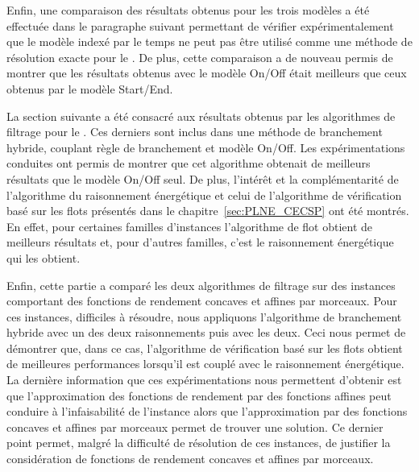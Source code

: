 Enfin, une comparaison des résultats obtenus pour les trois modèles
a été effectuée dans le paragraphe suivant permettant de vérifier
expérimentalement que
le modèle indexé par le temps ne peut pas être utilisé comme une méthode
de résolution exacte pour le \CECSP. De plus, cette comparaison a
de nouveau permis de montrer que les résultats obtenus avec le modèle
On/Off était meilleurs que ceux obtenus par le modèle Start/End. 

La section suivante a été consacré aux résultats obtenus par les
algorithmes de filtrage pour le \CECSP. Ces derniers sont inclus dans
une méthode de branchement hybride, couplant règle de branchement et
modèle On/Off. Les expérimentations conduites ont permis de montrer
que cet algorithme obtenait de meilleurs résultats que le modèle
On/Off seul. De plus, l'intérêt et la complémentarité de l'algorithme
du raisonnement énergétique et celui de l'algorithme de vérification
basé sur les flots présentés dans le chapitre~\ref{sec:PLNE_CECSP} ont
été montrés. En effet, pour certaines familles d'instances
l'algorithme de flot obtient de meilleurs résultats et, pour d'autres
familles, c'est le raisonnement énergétique qui les obtient.

Enfin, cette partie a comparé les deux algorithmes de
filtrage sur des instances comportant des fonctions de rendement
concaves et affines par morceaux. Pour ces instances, difficiles à
résoudre, nous appliquons l'algorithme de branchement hybride avec un
des deux raisonnements puis avec les deux. Ceci nous permet de
démontrer que, dans ce cas, l'algorithme de vérification basé sur les
flots obtient de meilleures performances lorsqu'il est couplé avec le
raisonnement énergétique. La dernière information que ces expérimentations
nous permettent d'obtenir est que l'approximation des fonctions de
rendement par des fonctions affines peut conduire à l'infaisabilité de
l'instance alors que l'approximation par des fonctions concaves et
affines par morceaux permet de trouver une solution. Ce dernier point
permet, malgré la difficulté de résolution de ces instances, de
justifier la considération de fonctions de rendement concaves et
affines par morceaux. 